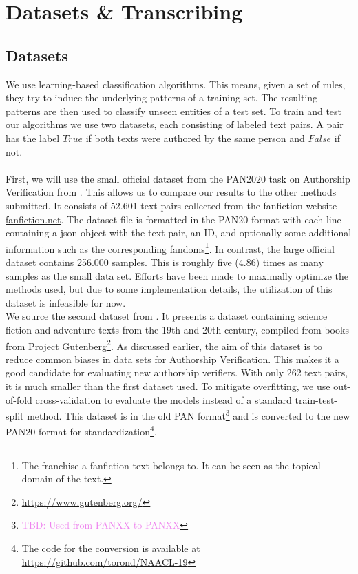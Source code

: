 \chapter{Datasets \& Transcribing}\label{ch:datasets}
\section{Datasets}
We use learning-based classification algorithms.
This means, given a set of rules, they try to induce the underlying patterns of a training set.
The resulting patterns are then used to classify unseen entities of a test set.
To train and test our algorithms we use two datasets, each consisting of labeled text pairs.
A pair has the label $True$ if both texts were authored by the same person and $False$ if not.\\\\
First, we will use the small official dataset from the PAN2020 task on Authorship Verification from \cite{bevendorff2020overview}.
This allows us to compare our results to the other methods submitted.
It consists of 52.601 text pairs collected from the fanfiction website \url{fanfiction.net}.
The dataset file is formatted in the PAN20 format with each line containing a json object with the text pair, an ID, and optionally some additional information such as the corresponding fandoms\footnote{The franchise a fanfiction text belongs to. It can be seen as the topical domain of the text.}.
In contrast, the large official dataset contains 256.000 samples.
This is roughly five (4.86) times as many samples as the small data set.
Efforts have been made to maximally optimize the methods used, but due to some implementation details, the utilization of this dataset is infeasible for now.\\
We source the second dataset from \cite{stein2019unbiasedGutenbergCorpus}.
It presents a dataset containing science fiction and adventure texts from the 19th and 20th century, compiled from books from Project Gutenberg\footnote{\url{https://www.gutenberg.org/}}.
As discussed earlier, the aim of this dataset is to reduce common biases in data sets for Authorship Verification.
This makes it a good candidate for evaluating new authorship verifiers.
With only 262 text pairs, it is much smaller than the first dataset used.
To mitigate overfitting, we use out-of-fold cross-validation to evaluate the models instead of a standard train-test-split method.
This dataset is in the old PAN format\footnote{\textcolor{violet}{TBD: Used from PANXX to PANXX}} and is converted to the new PAN20 format for standardization\footnote{The code for the conversion is available at \url{https://github.com/torond/NAACL-19}}.\\

